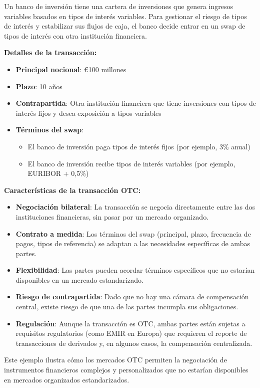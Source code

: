 \begin{ejemplo}
Un banco de inversión tiene una cartera de inversiones que genera ingresos variables basados en tipos de interés variables. Para gestionar el riesgo de tipos de interés y estabilizar sus flujos de caja, el banco decide entrar en un swap de tipos de interés con otra institución financiera.

\textbf{Detalles de la transacción:}
\begin{itemize}
\item \textbf{Principal nocional}: €100 millones
\item \textbf{Plazo}: 10 años
\item \textbf{Contrapartida}: Otra institución financiera que tiene inversiones con tipos de interés fijos y desea exposición a tipos variables
\item \textbf{Términos del swap}:
\begin{itemize}
\item El banco de inversión paga tipos de interés fijos (por ejemplo, 3\% anual)
\item El banco de inversión recibe tipos de interés variables (por ejemplo, EURIBOR + 0,5\%)
\end{itemize}
\end{itemize}

\textbf{Características de la transacción OTC:}
\begin{itemize}
\item \textbf{Negociación bilateral}: La transacción se negocia directamente entre las dos instituciones financieras, sin pasar por un mercado organizado.
\item \textbf{Contrato a medida}: Los términos del swap (principal, plazo, frecuencia de pagos, tipos de referencia) se adaptan a las necesidades específicas de ambas partes.
\item \textbf{Flexibilidad}: Las partes pueden acordar términos específicos que no estarían disponibles en un mercado estandarizado.
\item \textbf{Riesgo de contrapartida}: Dado que no hay una cámara de compensación central, existe riesgo de que una de las partes incumpla sus obligaciones.
\item \textbf{Regulación}: Aunque la transacción es OTC, ambas partes están sujetas a requisitos regulatorios (como EMIR en Europa) que requieren el reporte de transacciones de derivados y, en algunos casos, la compensación centralizada.
\end{itemize}

Este ejemplo ilustra cómo los mercados OTC permiten la negociación de instrumentos financieros complejos y personalizados que no estarían disponibles en mercados organizados estandarizados.
\end{ejemplo}

